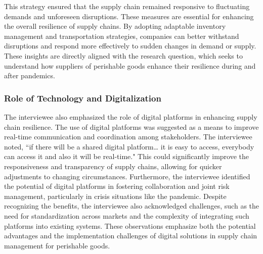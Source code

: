 This strategy ensured that the supply chain remained responsive to fluctuating demands and unforeseen disruptions.  These measures are essential for enhancing the overall resilience of supply chains. By adopting adaptable inventory management and transportation strategies, companies can better withstand disruptions and respond more effectively to sudden changes in demand or supply. These insights are directly aligned with the research question, which seeks to understand how suppliers of perishable goods enhance their resilience during and after pandemics.

\subsubsection{Role of Technology and Digitalization}
The interviewee also emphasized the role of digital platforms in enhancing supply chain resilience. The use of digital platforms was suggested as a means to improve real-time communication and coordination among stakeholders. The interviewee noted, “if there will be a shared digital platform… it is easy to access, everybody can access it and also it will be real-time." This could significantly improve the responsiveness and transparency of supply chains, allowing for quicker adjustments to changing circumstances. Furthermore, the interviewee identified the potential of digital platforms in fostering collaboration and joint risk management, particularly in crisis situations like the pandemic. Despite recognizing the benefits, the interviewee also acknowledged challenges, such as the need for standardization across markets and the complexity of integrating such platforms into existing systems. These observations emphasize both the potential advantages and the implementation challenges of digital solutions in supply chain management for perishable goods.

